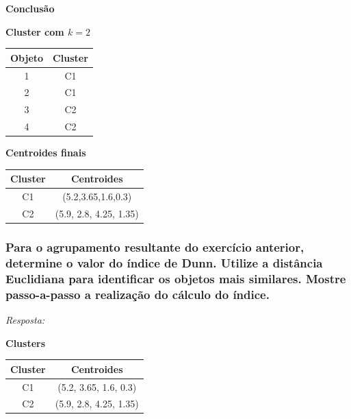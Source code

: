 \documentclass{article}
\begin{document}
  \textbf{Conclusão}

  \textbf{Cluster com $k=2$}
  \begin{table}[H]
    \centering
    \begin{tabular}{|c|c|}
    \hline
    \rowcolor[HTML]{EFEFEF} 
    \textbf{Objeto} & \textbf{Cluster} \\ \hline
    1               & C1               \\ \hline
    2               & C1               \\ \hline
    3               & C2               \\ \hline
    4               & C2               \\ \hline
    \end{tabular}
  \end{table}

  \textbf{Centroides finais}
  \begin{table}[H]
    \centering
    \begin{tabular}{|c|c|}
    \hline
    \rowcolor[HTML]{EFEFEF} 
    \textbf{Cluster} & \textbf{Centroides}  \\ \hline
    C1               & (5.2,3.65,1.6,0.3)   \\ \hline
    C2               & (5.9, 2.8, 4.25, 1.35) \\ \hline
    \end{tabular}
  \end{table}
  \newpage

  \subsubsection{Para o agrupamento resultante do exercício anterior, determine o valor do índice de Dunn. Utilize a distância Euclidiana para identificar os objetos mais similares. Mostre passo-a-passo a realização do cálculo do índice.}
  \textit{Resposta:} 

  

  \textbf{Clusters}
  \begin{table}[H]
    \centering
    \begin{tabular}{|c|c|}
    \hline
    \rowcolor[HTML]{EFEFEF} 
    \textbf{Cluster} & \textbf{Centroides}  \\ \hline
    C1               & (5.2, 3.65, 1.6, 0.3)   \\ \hline
    C2               & (5.9, 2.8, 4.25, 1.35) \\ \hline
    \end{tabular}
  \end{table}
\end{document}
